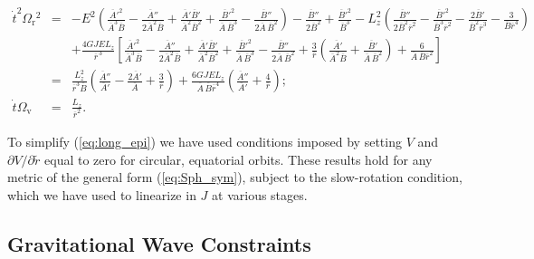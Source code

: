 \documentclass[aps,prd,amsfonts,amssymb,amsmath,nofootinbib,reprint,showpacs]{revtex4-1}
\newcommand{\eqnref}[1]{(\ref{eq:#1})}
\newcommand{\sub}[1]{\ensuremath{_\text{#1}}}
\begin{document}
\begin{widetext}
\begin{eqnarray}
\dot{t}^2\Omega\sub{r}^2 & = & -E^2 \left( \frac{\overline{A}'^2}{\overline{A}^3 \overline{B}} - \frac{\overline{A}''}{2\overline{A}^2\overline{B}} + \frac{\overline{A}'\overline{B}'}{\overline{A}^2\overline{B}^2} + \frac{\overline{B}'^2}{\overline{A}\,\overline{B}^3} - \frac{\overline{B}''}{2\overline{A}\,\overline{B}^2} \right) - \frac{\overline{B}''}{2\overline{B}^2} +  \frac{\overline{B}'^2}{\overline{B}^3} - L_z^2 \left(\frac{\overline{B}''}{2\overline{B}^2 \overline{r}^2} - \frac{\overline{B}'^2}{\overline{B}^3 \overline{r}^2} - \frac{2\overline{B}'}{\overline{B}^2 \overline{r}^3}-\frac{3}{\overline{B} \overline{r}^4} \right) \nonumber \\
& & + \frac{4GJEL_z}{\overline{r}^{\,3}} \left[ \frac{\overline{A}'^2}{\overline{A}^3 \overline{B}} - \frac{\overline{A}''}{2\overline{A}^2\overline{B}} + \frac{\overline{A}'\overline{B}'}{\overline{A}^2\overline{B}^2} + \frac{\overline{B}'^2}{\overline{A}\,\overline{B}^3} - \frac{\overline{B}''}{2\overline{A}\,\overline{B}^2} +\frac{3}{\overline{r}}\left(\frac{\overline{A}'}{\overline{A}^2\overline{B}}+\frac{\overline{B}'}{\overline{A}\,\overline{B}^2}\right) +\frac{6}{\overline{A}\,\overline{B}\overline{r}^2}\right] \label{eq:long_epi} \\
& = &  \frac{L_z^2}{\overline{r}^3\overline{B}}\left(\frac{\overline{A}''}{\overline{A}'} - \frac{2\overline{A}'}{\overline{A}} + \frac{3}{\overline{r}}\right) +\frac{6GJEL_z}{\overline{A}\,\overline{B} \overline{r}^4} \left(\frac{\overline{A}''}{\overline{A}'} + \frac{4}{\overline{r}}\right); \\
\dot{t}\Omega\sub{v} & = & \frac{L_z}{\overline{r}^2}.
\end{eqnarray}
\end{widetext}
To simplify \eqnref{long_epi} we have used conditions imposed by setting $V$ and $\partial V/\partial \widetilde{r}$ equal to zero for circular, equatorial orbits. These results hold for any metric of the general form \eqnref{Sph_sym}, subject to the slow-rotation condition, which we have used to linearize in $J$ at various stages.

\subsection{Gravitational Wave Constraints}
\end{document}

